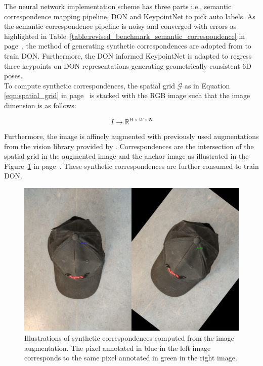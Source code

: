 The neural network implementation scheme has three parts i.e., semantic correspondence mapping pipeline, \ac{DON} and KeypointNet to pick auto labels.
As the semantic correspondence pipeline is noisy and converged with errors as highlighted in Table~\ref{table:revised_benchmark_semantic_correspondence} in page~\pageref{table:revised_benchmark_semantic_correspondence},
the method of generating synthetic correspondences are adopted from \cite{adrian2022efficient} to train \ac{DON}. Furthermore, the \ac{DON} informed KeypointNet is adapted to regress
three keypoints on \ac{DON} representations generating geometrically consistent 6D poses.\\

To compute synthetic correspondences, the spatial grid $\mathcal{G}$ as in Equation \ref{eqn:spatial_grid} in page~\pageref{eqn:spatial_grid} is stacked
with the \ac{RGB} image such that the image dimension is as follows:

\begin{equation}
    I \rightarrow \mathbb{R}^{H \times W \times \mathbf{5}}
\end{equation}

Furthermore, the image is affinely augmented with previously used augmentations from the vision library provided by \cite{paszke2019pytorch}. Correspondences are the intersection of the spatial grid in the augmented image and the anchor image as illustrated in the Figure~\ref{fig:synthetic_correspondences}
in page~\pageref{fig:synthetic_correspondences}. These synthetic correspondences are further consumed to train \ac{DON}.

\begin{figure}[htb]
    \centering
    \caption{Illustrations of synthetic correspondences computed from the image augmentation. The pixel annotated in blue in the left image corresponds to the same pixel annotated in green in the right image.}
    \label{fig:synthetic_correspondences}
    \includegraphics[scale=0.1]{images/cap/aug_image.png}
\end{figure}

